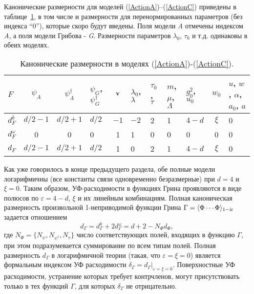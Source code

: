 \documentclass[a4paper,10pt]{article}
\begin{document}
Канонические размерности для моделей (\ref{ActionA})--(\ref{ActionC})
приведены в таблице~\ref{table1}, в том числе и размерности для перенормированных параметров (без индекса ``0''), которые скоро будут введены.
Поля модели {\it A} отмечены индексом {\it A},
а поля  модели Грибова - {\it G}. Размерности параметров $\lambda_{0}$, $\tau_{0}$ и т.д. одинаковы в обеих моделях.
\begin{table}[H]
\caption{Канонические размерности в моделях (\protect\ref{ActionA})-(\protect\ref{ActionC}).}
\label{table1}
\begin{tabular}{|p{0.3cm}|c|c|p{0.5cm}|c|p{0.5cm}|p{0.5cm}|p{0.5cm}|p{0.7cm}|c|p{1cm}|}
\hline
$F$ & $\psi_{A}$ & $\psi_{A}^{\dag}$ & $\psi_{G}$, $\psi_{G}^{\dag}$ &
$ {\bf v} $ &   $\lambda_{0}$, $\lambda$ &
$\tau_{0}$, $\tau$ &  $m$, $\mu$,$\Lambda$ & $g_{0}^{2}$, $u_{0}$ &
$w_{0}$ & $u$, $w$, $\alpha$, $a_{0}$, $a$ \\
\hline
$d_{F}^{k}$ & $d/2-1$ & $d/2+1$ & $d/2$ & $-1$ & $-2$  & 2
& 1 &  $4-d$ & $\xi$ & 0 \\
\hline
$d_{F}^{\omega }$ & 0 & 0& 0 & 1 & 1 & 0 & 0 &  0 & 0 & 0 \\
\hline
$d_{F}$ & $d/2-1$ & $d/2+1$ &
$d/2$ & 1 & 0 & 2 & 1 &  $4-d$  & $\xi$ & 0 \\
\hline
\end{tabular}
\end{table}
Как уже говорилось в конце предыдущего раздела, обе полные модели логарифмичны (все константы связи одновременно безразмерные) при  $d=4$ и $\xi=0$.
Таким образом, УФ-расходимости в функциях Грина проявляются в виде полюсов по $\varepsilon = 4-d$, $\xi$  и их линейным комбинациям.
Полная каноническая размерность произвольной 1-неприводимой функции Грина $\Gamma = \langle\Phi \cdots \Phi \rangle _{\rm 1-ir}$
задается отношением  \cite{Book3}
\begin{equation}
d_{\Gamma }=d_{\Gamma }^k+2d_{\Gamma }^{\omega }= d+2-N_{\Phi }d_{\Phi},
\label{dGamma}
\end{equation}
 где
 $N_{\Phi}=\{N_{\psi},N_{\psi^{\dag}}, N_{v}\}$  число соответствующих полей, входящих в функцию  $\Gamma$,
при этом подразумевается суммирование по всем типам полей. Полная размерность $d_{\Gamma}$
в логарифмичной теории (такая, что $\varepsilon=\xi=0$) является формальным индексом УФ расходимости
 $\delta_{\Gamma}=d_{\Gamma}|_{\varepsilon=\xi=0}$. Поверхностные УФ расходимости, устранение которых требует контрчленов, могут присутствовать
 только в тех функций  $\Gamma$, для которых $\delta_{\Gamma}$ не отрицательно.
\end{document}
